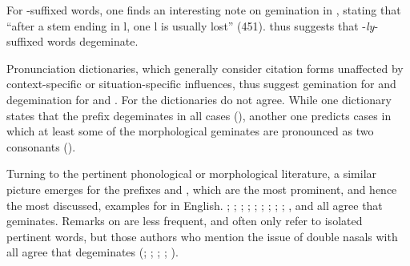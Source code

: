   For -suffixed words, one finds an interesting note on gemination in \cite{Wells.2008}, stating that ``after a stem ending in l, one l is usually lost'' (451). \cite{Wells.2008} thus suggests that \hbox{-}\textit{ly}-suffixed words {degeminate}.

 
 Pronunciation dictionaries, which generally consider citation forms unaffected by context-specific or situation-specific influences, thus suggest gemination for  and {degemination} for  and . For  the dictionaries do not agree. While one dictionary states that the prefix {degeminates} in all cases (\citealt{Wells.2008}), another one predicts cases in which at least some of the  morphological geminates are pronounced as two consonants (\citealt{Roach.2011}).
 
 
Turning to the pertinent phonological or morphological literature, a similar picture emerges for the prefixes  and , which are the most prominent, and hence the most discussed, examples for  in English. \citet[141]{Wijk.1966}; \citet[255]{OConnor.1973}; \citet[18]{Mohanan.1986}; \citet[119ff.]{Borowsky.1986}; \citet[111]{Catford.1988}; \citet[106]{Kreidler.1989}; \citet[251]{Ladefoged.1993}; \citet[18]{Harris.1994}; \citet[22]{Spencer.1996}; \citet[1055f.]{CohenGoldberg.2013}, and \citet{Cruttenden.2014} all agree that  geminates. Remarks on  are less frequent, and often only refer to isolated pertinent words, but those authors who mention the issue of double nasals with  all agree that  {degeminates} (\citealt[251]{Ladefoged.1993}; \citealt[18]{Mohanan.1986}; \citealt[18ff.]{Harris.1994}; \citealt[248]{Cruttenden.2014}; \citealt[1055f.]{CohenGoldberg.2013}).


